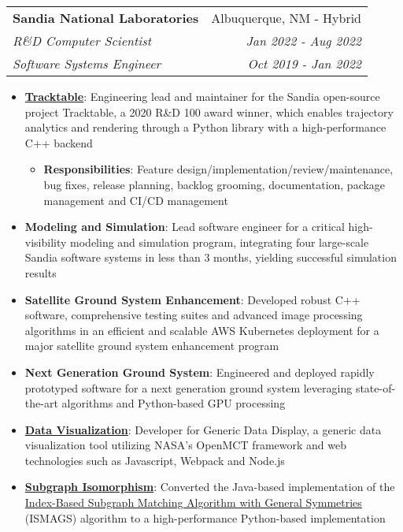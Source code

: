\documentclass[letterpaper,10pt]{article}
\makeatletter
\newcommand{\resumeItem}[2]{
  \item\small{
    \textbf{#1}{: #2 \vspace{-2pt}}
  }
}
\newcommand{\resumeSubheadingPromo}[6]{
  \vspace{-1pt}\item
    \begin{tabular*}{0.97\textwidth}{l@{\extracolsep{\fill}}r}
      \textbf{#1} & #2 \\
      \textit{\small#3} & \textit{\small #4} \\
      \textit{\small#5} & \textit{\small #6} \\
    \end{tabular*}\vspace{-5pt}
}
\newcommand{\resumeItemListStart}{\begin{itemize}}
\newcommand{\resumeItemListEnd}{\end{itemize}\vspace{-1pt}}
\makeatother
\begin{document}
  \resumeSubheadingPromo
    {Sandia National Laboratories}{Albuquerque, NM - Hybrid}
    {R\&D Computer Scientist}{Jan 2022 - Aug 2022}
    {Software Systems Engineer}{Oct 2019 - Jan 2022}
    \resumeItemListStart
      \resumeItem{\href{https://tracktable.sandia.gov/}{Tracktable}}
        {Engineering lead and maintainer for the Sandia open-source project Tracktable, a 2020 R\&D 100 award winner, which enables trajectory analytics and rendering through a Python library with a high-performance C++ backend}
        \resumeItemListStart
          \resumeItem{Responsibilities}{Feature design/implementation/review/maintenance, bug fixes, release planning, backlog grooming, documentation, package management and CI/CD management}
        \resumeItemListEnd
      \resumeItem{Modeling and Simulation}
        {Lead software engineer for a critical high-visibility modeling and simulation program, integrating four large-scale Sandia software systems in less than 3 months, yielding successful simulation results}
      \resumeItem{Satellite Ground System Enhancement}
        {Developed robust C++ software, comprehensive testing suites and advanced image processing algorithms in an efficient and scalable AWS Kubernetes deployment for a major satellite ground system enhancement program}
      \resumeItem{Next Generation Ground System}
        {Engineered and deployed rapidly prototyped software for a next generation ground system leveraging state-of-the-art algorithms and Python-based GPU processing}
      \resumeItem{\href{https://github.com/sandialabs/generic-data-display}{Data Visualization}}
        {Developer for Generic Data Display, a generic data visualization tool utilizing NASA's OpenMCT framework and web technologies such as Javascript, Webpack and Node.js}
      \resumeItem{\href{https://github.com/sandialabs/ISMAGS-in-Python}{Subgraph Isomorphism}}
        {Converted the Java-based implementation of the \href{https://github.com/biointec/ismags}{Index-Based Subgraph Matching Algorithm with General Symmetries} (ISMAGS) algorithm to a high-performance Python-based implementation}
    \resumeItemListEnd
\end{document}

